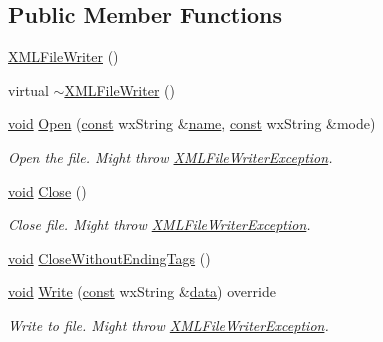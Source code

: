 \subsection*{Public Member Functions}
\begin{DoxyCompactItemize}
\item 
\hyperlink{class_x_m_l_file_writer_aa415c3c7e3ad07686ab90a29e740947b}{X\+M\+L\+File\+Writer} ()
\item 
virtual \hyperlink{class_x_m_l_file_writer_abaae60da7cca1d23290531b438695d5f}{$\sim$\+X\+M\+L\+File\+Writer} ()
\item 
\hyperlink{sound_8c_ae35f5844602719cf66324f4de2a658b3}{void} \hyperlink{class_x_m_l_file_writer_ac29a957aba98be58e7401ffee2ec2082}{Open} (\hyperlink{getopt1_8c_a2c212835823e3c54a8ab6d95c652660e}{const} wx\+String \&\hyperlink{lib_2expat_8h_a1b49b495b59f9e73205b69ad1a2965b0}{name}, \hyperlink{getopt1_8c_a2c212835823e3c54a8ab6d95c652660e}{const} wx\+String \&mode)
\begin{DoxyCompactList}\small\item\em Open the file. Might throw \hyperlink{class_x_m_l_file_writer_exception}{X\+M\+L\+File\+Writer\+Exception}. \end{DoxyCompactList}\item 
\hyperlink{sound_8c_ae35f5844602719cf66324f4de2a658b3}{void} \hyperlink{class_x_m_l_file_writer_a3a0d868ea5a8fba069b32b67646af5a9}{Close} ()
\begin{DoxyCompactList}\small\item\em Close file. Might throw \hyperlink{class_x_m_l_file_writer_exception}{X\+M\+L\+File\+Writer\+Exception}. \end{DoxyCompactList}\item 
\hyperlink{sound_8c_ae35f5844602719cf66324f4de2a658b3}{void} \hyperlink{class_x_m_l_file_writer_ac77f74d80a18d9dbb93d482a10f7e6d1}{Close\+Without\+Ending\+Tags} ()
\item 
\hyperlink{sound_8c_ae35f5844602719cf66324f4de2a658b3}{void} \hyperlink{class_x_m_l_file_writer_a4db0b4eca2a10038fe12d8e5f42c7828}{Write} (\hyperlink{getopt1_8c_a2c212835823e3c54a8ab6d95c652660e}{const} wx\+String \&\hyperlink{lib_2expat_8h_ac39e72a1de1cb50dbdc54b08d0432a24}{data}) override
\begin{DoxyCompactList}\small\item\em Write to file. Might throw \hyperlink{class_x_m_l_file_writer_exception}{X\+M\+L\+File\+Writer\+Exception}. \end{DoxyCompactList}\end{DoxyCompactItemize}
